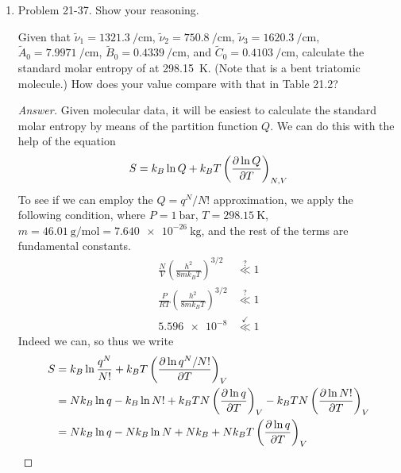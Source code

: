 \documentclass[../psets.tex]{subfiles}
\begin{document}
\begin{enumerate}
\begin{proof}[Answer]
\begin{align*}
            \Delta_\text{vap}\overline{S}(\text{bromine}) &= \SI{90.24}{\joule\per\kelvin\per\mole}
        \end{align*}
        Since the mean of this set of values of $\Delta_\text{vap}\overline{S}$ is $87.29\approx 88$ and the standard deviation is relatively small, the given data supports Trouton's rule.
    \end{proof}
    \item Problem 21-37. Show your reasoning.\par
    Given that $\tilde{\nu}_1=\SI{1321.3}{\per\centi\meter}$, $\tilde{\nu}_2=\SI{750.8}{\per\centi\meter}$, $\tilde{\nu}_3=\SI{1620.3}{\per\centi\meter}$, $\tilde{A}_0=\SI{7.9971}{\per\centi\meter}$, $\tilde{B}_0=\SI{0.4339}{\per\centi\meter}$, and $\tilde{C}_0=\SI{0.4103}{\per\centi\meter}$, calculate the standard molar entropy of  at \SI{298.15}{\kelvin}. (Note that  is a bent triatomic molecule.) How does your value compare with that in Table 21.2?
    \begin{proof}[Answer]
        Given molecular data, it will be easiest to calculate the standard molar entropy by means of the partition function $Q$. We can do this with the help of the equation
        \begin{equation*}
            S = k_B\ln Q+k_BT\left( \pdv{\ln Q}{T} \right)_{N,V}
        \end{equation*}
        To see if we can employ the $Q=q^N/N!$ approximation, we apply the following condition, where $P=\SI{1}{\bar}$, $T=\SI{298.15}{\kelvin}$, $m=\SI[per-mode=symbol]{46.01}{\gram\per\mole}=\SI{7.640e-26}{\kilo\gram}$, and the rest of the terms are fundamental constants.
        \begin{align*}
            \frac{N}{V}\left( \frac{h^2}{8mk_BT} \right)^{3/2} &\stackrel{?}{\ll} 1\\
            \frac{P}{RT}\left( \frac{h^2}{8mk_BT} \right)^{3/2} &\stackrel{?}{\ll} 1\\
            \num{5.596e-8} &\stackrel{\checkmark}{\ll} 1
        \end{align*}
        Indeed we can, so thus we write
        \begin{align*}
            S &= k_B\ln\frac{q^N}{N!}+k_BT\left( \pdv{\ln q^N/N!}{T} \right)_V\\
            &= Nk_B\ln q-k_B\ln N!+k_BTN\left( \pdv{\ln q}{T} \right)_V-k_BTN\left( \pdv{\ln N!}{T} \right)_V\\
            &= Nk_B\ln q-Nk_B\ln N+Nk_B+Nk_BT\left( \pdv{\ln q}{T} \right)_V\\

\end{align*}
\end{proof}
\end{enumerate}
\end{document}
